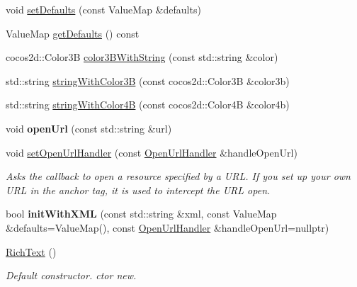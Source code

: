 \begin{DoxyCompactItemize}
\item 
void \hyperlink{classui_1_1RichText_a81b7598f89c8fa589afb315ff74f5aa3}{set\+Defaults} (const Value\+Map \&defaults)
\item 
Value\+Map \hyperlink{classui_1_1RichText_ac5ae824e98115ea1e26ac5dde056e448}{get\+Defaults} () const
\item 
cocos2d\+::\+Color3B \hyperlink{classui_1_1RichText_a1303c59d7cc30d83570ca248b08d09a4}{color3\+B\+With\+String} (const std\+::string \&color)
\item 
std\+::string \hyperlink{classui_1_1RichText_ab923374d5a30f539696c9a4f887b4307}{string\+With\+Color3B} (const cocos2d\+::\+Color3B \&color3b)
\item 
std\+::string \hyperlink{classui_1_1RichText_a82ba2d0b27f544d8f729cf18a32d3bad}{string\+With\+Color4B} (const cocos2d\+::\+Color4B \&color4b)
\item 
\mbox{\label{classui_1_1RichText_a7b7911f8d219b556d41a86bfdaca6887}} 
void {\bfseries open\+Url} (const std\+::string \&url)
\item 
void \hyperlink{classui_1_1RichText_afd77b67b1697a3e837a31fb88df0795e}{set\+Open\+Url\+Handler} (const \hyperlink{classui_1_1RichText_ad3631ae61d204f1d9576f5923bbd762e}{Open\+Url\+Handler} \&handle\+Open\+Url)
\begin{DoxyCompactList}\small\item\em Asks the callback to open a resource specified by a U\+RL.  If you set up your own U\+RL in the anchor tag, it is used to intercept the U\+RL open. \end{DoxyCompactList}\item 
\mbox{\label{classui_1_1RichText_a854a0d338833d1f4608a3f71a87e4da8}} 
bool {\bfseries init\+With\+X\+ML} (const std\+::string \&xml, const Value\+Map \&defaults=Value\+Map(), const \hyperlink{classui_1_1RichText_ad3631ae61d204f1d9576f5923bbd762e}{Open\+Url\+Handler} \&handle\+Open\+Url=nullptr)
\item 
\mbox{\label{classui_1_1RichText_ac16e7db472bb0474b3a13e76468fac9d}} 
\hyperlink{classui_1_1RichText_ac16e7db472bb0474b3a13e76468fac9d}{Rich\+Text} ()
\begin{DoxyCompactList}\small\item\em Default constructor.  ctor  new. \end{DoxyCompactList}\item 

\end{DoxyCompactItemize}
